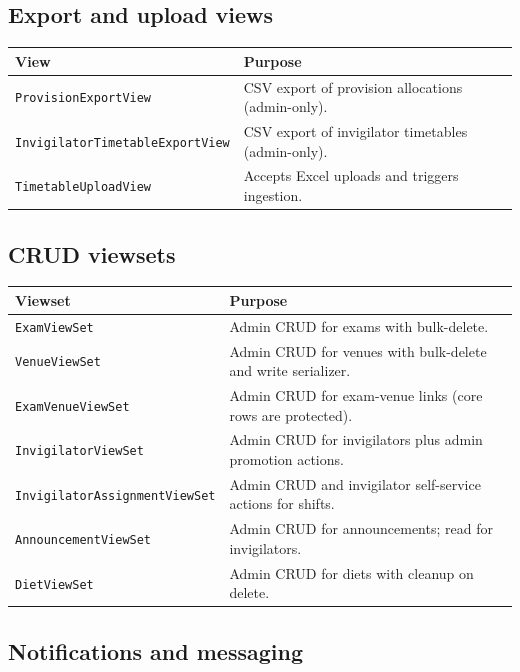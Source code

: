 \subsection{Export and upload views}
\label{subsec:api:views:exports}

\begin{longtable}{p{}p{}}
\toprule
\textbf{View} & \textbf{Purpose} \\
\midrule
\texttt{ProvisionExportView} & CSV export of provision allocations (admin-only). \\
\texttt{InvigilatorTimetableExportView} & CSV export of invigilator timetables (admin-only). \\
\texttt{TimetableUploadView} & Accepts Excel uploads and triggers ingestion. \\
\bottomrule
\end{longtable}

\subsection{CRUD viewsets}
\label{subsec:api:views:crud}

\begin{longtable}{p{}p{}}
\toprule
\textbf{Viewset} & \textbf{Purpose} \\
\midrule
\texttt{ExamViewSet} & Admin CRUD for exams with bulk-delete. \\
\texttt{VenueViewSet} & Admin CRUD for venues with bulk-delete and write serializer. \\
\texttt{ExamVenueViewSet} & Admin CRUD for exam-venue links (core rows are protected). \\
\texttt{InvigilatorViewSet} & Admin CRUD for invigilators plus admin promotion actions. \\
\texttt{InvigilatorAssignmentViewSet} & Admin CRUD and invigilator self-service actions for shifts. \\
\texttt{AnnouncementViewSet} & Admin CRUD for announcements; read for invigilators. \\
\texttt{DietViewSet} & Admin CRUD for diets with cleanup on delete. \\
\bottomrule
\end{longtable}

\subsection{Notifications and messaging}
\label{subsec:api:views:notifications}

